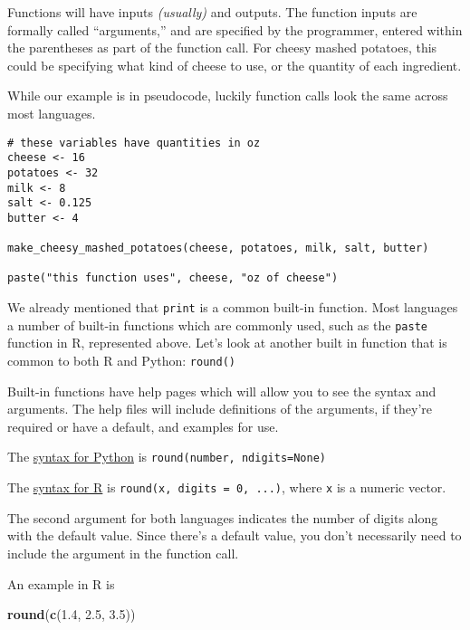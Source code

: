 \documentclass[
]{book}
\newenvironment{Shaded}{\begin{snugshade}}{\end{snugshade}}
\newcommand{\FloatTok}[1]{\textcolor[rgb]{0.00,0.00,0.81}{#1}}
\newcommand{\FunctionTok}[1]{\textcolor[rgb]{0.13,0.29,0.53}{\textbf{#1}}}
\newcommand{\NormalTok}[1]{#1}
\begin{document}
Functions will have inputs \emph{(usually)} and outputs. The function inputs are formally called ``arguments,'' and are specified by the programmer, entered within the parentheses as part of the function call. For cheesy mashed potatoes, this could be specifying what kind of cheese to use, or the quantity of each ingredient.

While our example is in pseudocode, luckily function calls look the same across most languages.

\begin{verbatim}
# these variables have quantities in oz
cheese <- 16
potatoes <- 32
milk <- 8
salt <- 0.125
butter <- 4

make_cheesy_mashed_potatoes(cheese, potatoes, milk, salt, butter)

paste("this function uses", cheese, "oz of cheese")
\end{verbatim}

We already mentioned that \texttt{print} is a common built-in function. Most languages a number of built-in functions which are commonly used, such as the \texttt{paste} function in R, represented above. Let's look at another built in function that is common to both R and Python: \texttt{round()}

Built-in functions have help pages which will allow you to see the syntax and arguments. The help files will include definitions of the arguments, if they're required or have a default, and examples for use.

The \href{https://docs.python.org/3/library/functions.html\#round}{syntax for Python} is \texttt{round(number,\ ndigits=None)}

The \href{https://search.r-project.org/R/refmans/base/html/Round.html}{syntax for R} is \texttt{round(x,\ digits\ =\ 0,\ ...)}, where \texttt{x} is a numeric vector.

The second argument for both languages indicates the number of digits along with the default value. Since there's a default value, you don't necessarily need to include the argument in the function call.

An example in R is

\begin{Shaded}
\begin{Highlighting}[]
\FunctionTok{round}\NormalTok{(}\FunctionTok{c}\NormalTok{(}\FloatTok{1.4}\NormalTok{, }\FloatTok{2.5}\NormalTok{, }\FloatTok{3.5}\NormalTok{))}
\end{Highlighting}
\end{Shaded}
\end{document}
